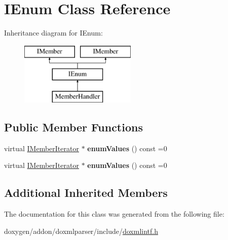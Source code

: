 \hypertarget{class_i_enum}{}\section{I\+Enum Class Reference}
\label{class_i_enum}
Inheritance diagram for I\+Enum\+:\begin{figure}[H]
\begin{center}
\leavevmode
\includegraphics[height=3.000000cm]{class_i_enum}
\end{center}
\end{figure}
\subsection*{Public Member Functions}
\begin{DoxyCompactItemize}
\item 
\mbox{\label{class_i_enum_ac7cdad450ff7a6618e5c01d458f01d05}} 
virtual \mbox{\hyperlink{class_i_member_iterator}{I\+Member\+Iterator}} $\ast$ {\bfseries enum\+Values} () const =0
\item 
\mbox{\label{class_i_enum_ac7cdad450ff7a6618e5c01d458f01d05}} 
virtual \mbox{\hyperlink{class_i_member_iterator}{I\+Member\+Iterator}} $\ast$ {\bfseries enum\+Values} () const =0
\end{DoxyCompactItemize}
\subsection*{Additional Inherited Members}


The documentation for this class was generated from the following file\+:\begin{DoxyCompactItemize}
\item 
doxygen/addon/doxmlparser/include/\mbox{\hyperlink{include_2doxmlintf_8h}{doxmlintf.\+h}}\end{DoxyCompactItemize}
